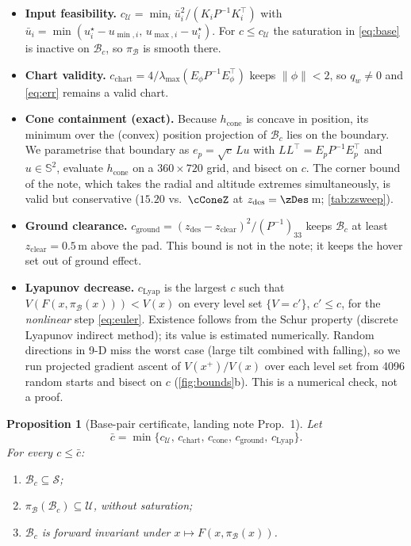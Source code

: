 \documentclass[11pt,a4paper]{article}
\newtheorem{proposition}{Proposition}
\newcommand{\B}{\mathcal{B}}
\newcommand{\U}{\mathcal{U}}
\newcommand{\Sset}{\mathcal{S}}
\newcommand{\hc}{h_{\mathrm{cone}}}
\newcommand{\zd}{z_{\mathrm{des}}}
\begin{document}
\begin{itemize}
\item \textbf{Input feasibility.} $c_{\U}=\min_i \bar u_i^2/(K_iP^{-1}K_i^\top)$ with
$\bar u_i=\min(u^\star_i-u_{\min,i},\,u_{\max,i}-u^\star_i)$. For $c\le c_{\U}$ the saturation in
\eqref{eq:base} is inactive on $\B_c$, so $\pi_{\B}$ is smooth there.
\item \textbf{Chart validity.} $c_{\mathrm{chart}}=4/\lambda_{\max}(E_\phi P^{-1}E_\phi^\top)$ keeps
$\|\phi\|<2$, so $q_w\neq0$ and \eqref{eq:err} remains a valid chart.
\item \textbf{Cone containment (exact).} Because $\hc$ is concave in position, its minimum over the
(convex) position projection of $\B_c$ lies on the boundary. We parametrise that boundary as
$e_p=\sqrt c\,Lu$ with $LL^\top=E_pP^{-1}E_p^\top$ and $u\in\mathbb{S}^2$, evaluate $\hc$ on a
$360\times720$ grid, and bisect on $c$. The corner bound of the note, which takes the radial and altitude
extremes simultaneously, is valid but conservative ($15.20$ vs.\ $\cConeZ$ at $\zd=\zDes$\,m;
\cref{tab:zsweep}).
\item \textbf{Ground clearance.} $c_{\mathrm{ground}}=(\zd-z_{\mathrm{clear}})^2/(P^{-1})_{33}$ keeps $\B_c$
at least $z_{\mathrm{clear}}=0.5$\,m above the pad. This bound is not in the note; it keeps the hover set
out of ground effect.
\item \textbf{Lyapunov decrease.} $c_{\mathrm{Lyap}}$ is the largest $c$ such that
$V(F(x,\pi_{\B}(x)))<V(x)$ on every level set $\{V=c'\}$, $c'\le c$, for the \emph{nonlinear} step
\eqref{eq:euler}. Existence follows from the Schur property (discrete Lyapunov indirect method); its
value is estimated numerically. Random directions in 9-D miss the worst case (large tilt combined with
falling), so we run projected gradient ascent of $V(x^+)/V(x)$ over each level set from 4096 random
starts and bisect on $c$ (\cref{fig:bounds}b). This is a numerical check, not a proof.
\end{itemize}

\begin{proposition}[Base-pair certificate, landing note Prop.~1]
Let
\[\bar c=\min\{c_{\U},\,c_{\mathrm{chart}},\,c_{\mathrm{cone}},\,c_{\mathrm{ground}},\,c_{\mathrm{Lyap}}\}.\]
For every $c\le\bar c$:
\begin{enumerate}[label=(\roman*),nosep]
\item $\B_c\subseteq\Sset$;
\item $\pi_{\B}(\B_c)\subseteq\U$, without saturation;
\item $\B_c$ is forward invariant under $x\mapsto F(x,\pi_{\B}(x))$.
\end{enumerate}
\end{proposition}
\end{document}

